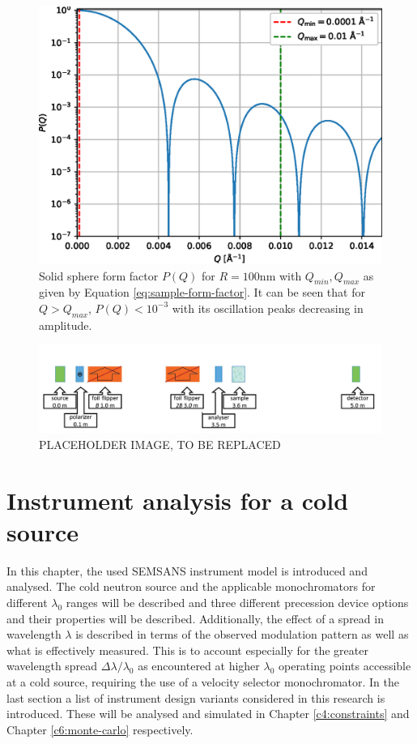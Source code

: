 \documentclass{article}
\begin{document}
\begin{figure}
	\centering
	\includegraphics[width=0.5\linewidth]{analytical-P-log}
	\caption{Solid sphere form factor $P(Q)$ for $R = 100\unit{\nano\meter}$ with $Q_{min}, Q_{max}$ as given by Equation \eqref{eq:sample-form-factor}. It can be seen that for $Q > Q_{max}$, $P(Q) < 10^{-3}$ with its oscillation peaks decreasing in amplitude.}
	\label{fig:analytical-P}
\end{figure}

\newpage
\begin{figure}
	\centering
	\includegraphics[width=\linewidth]{config-placeholder}
	\caption{PLACEHOLDER IMAGE, TO BE REPLACED}
	\label{fig:instrument-config}
\end{figure}

\section{Instrument analysis for a cold source}
\label{c3}
In this chapter, the used SEMSANS instrument model is introduced and analysed. The cold neutron source and the applicable monochromators for different $\lambda_0$ ranges will be described and three different precession device options and their properties will be described. Additionally, the effect of a spread in wavelength $\lambda$ is described in terms of the observed modulation pattern as well as what is effectively measured. This is to account especially for the greater wavelength spread $\Delta\lambda/\lambda_0$ as encountered at higher $\lambda_0$ operating points accessible at a cold source, requiring the use of a velocity selector monochromator. In the last section a list of instrument design variants considered in this research is introduced. These will be analysed and simulated in Chapter \ref{c4:constraints} and Chapter \ref{c6:monte-carlo} respectively. 
\end{document}
